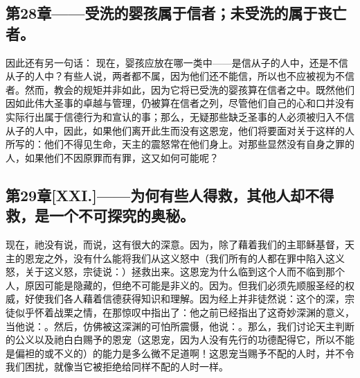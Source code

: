 
\subsection{第28章——受洗的婴孩属于信者；未受洗的属于丧亡者。}

因此还有另一句话： 现在，婴孩应放在哪一类中——是信从子的人中，还是不信从子的人中？有些人说，两者都不属，因为他们还不能信，所以也不应被视为不信者。然而，教会的规矩并非如此，因为它将已受洗的婴孩算在信者之中。既然他们因如此伟大圣事的卓越与管理，仍被算在信者之列，尽管他们自己的心和口并没有实际行出属于信德行为和宣认的事；那么，无疑那些缺乏圣事的人必须被归入不信从子的人中，因此，如果他们离开此生而没有这恩宠，他们将要面对关于这样的人所写的：他们不得见生命，天主的震怒常在他们身上。对那些显然没有自身之罪的人，如果他们不因原罪而有罪，这又如何可能呢？\par


\subsection{第29章[XXI.]——为何有些人得救，其他人却不得救，是一个不可探究的奥秘。}

现在，祂没有说，而说，这有很大的深意。因为，除了藉着我们的主耶稣基督，天主的恩宠之外，没有什么能将我们从这义怒中（我们所有的人都在罪中陷入这义怒，关于这义怒，宗徒说：）拯救出来。这恩宠为什么临到这个人而不临到那个人，原因可能是隐藏的，但绝不可能是非义的。因为。但我们必须先顺服圣经的权威，好使我们各人藉着信德获得知识和理解。因为经上并非徒然说：这个的深，宗徒似乎怀着战栗之情，在那惊叹中指出了：他之前已经指出了这奇妙深渊的意义，当他说：。然后，仿佛被这深渊的可怕所震慑，他说：。那么，我们讨论天主判断的公义以及祂白白赐予的恩宠（这恩宠，因为人没有先行的功德配得它，所以不能是偏袒的或不义的）的能力是多么微不足道啊！这恩宠当赐予不配的人时，并不令我们困扰，就像当它被拒绝给同样不配的人时一样。\par

